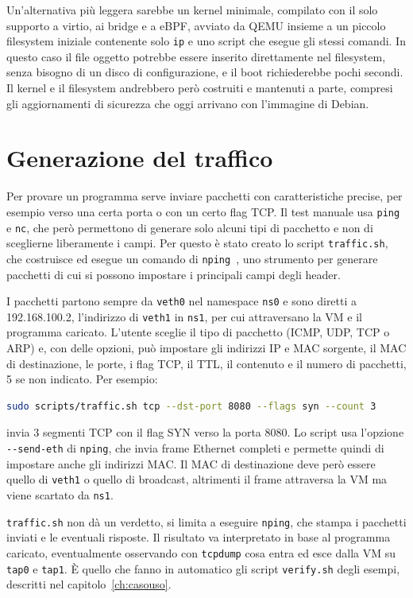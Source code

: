 Un'alternativa più leggera sarebbe un kernel minimale, compilato con il solo supporto a virtio, ai bridge e a eBPF, avviato da QEMU insieme a un piccolo filesystem iniziale contenente solo \texttt{ip} e uno script che esegue gli stessi comandi. In questo caso il file oggetto potrebbe essere inserito direttamente nel filesystem, senza bisogno di un disco di configurazione, e il boot richiederebbe pochi secondi.
Il kernel e il filesystem andrebbero però costruiti e mantenuti a parte, compresi gli aggiornamenti di sicurezza che oggi arrivano con l'immagine di Debian.

\section{Generazione del traffico}\label{sec:traffico}

Per provare un programma serve inviare pacchetti con caratteristiche precise, per esempio verso una certa porta o con un certo flag TCP. Il test manuale usa \texttt{ping} e \texttt{nc}, che però permettono di generare solo alcuni tipi di pacchetto e non di sceglierne liberamente i campi. Per questo è stato creato lo script \texttt{traffic.sh}, che costruisce ed esegue un comando di \texttt{nping}~\cite{nping}, uno strumento per generare pacchetti di cui si possono impostare i principali campi degli header.

I pacchetti partono sempre da \texttt{veth0} nel namespace \texttt{ns0} e sono diretti a 192.168.100.2, l'indirizzo di \texttt{veth1} in \texttt{ns1}, per cui attraversano la VM e il programma caricato. L'utente sceglie il tipo di pacchetto (ICMP, UDP, TCP o ARP) e, con delle opzioni, può impostare gli indirizzi IP e MAC sorgente, il MAC di destinazione, le porte, i flag TCP, il TTL, il contenuto e il numero di pacchetti, 5 se non indicato. Per esempio:
\begin{lstlisting}[language=bash, numbers=none, columns=fullflexible]
sudo scripts/traffic.sh tcp --dst-port 8080 --flags syn --count 3
\end{lstlisting}
invia 3 segmenti TCP con il flag SYN verso la porta 8080. Lo script usa l'opzione \texttt{-{}-send-eth} di \texttt{nping}, che invia frame Ethernet completi e permette quindi di impostare anche gli indirizzi MAC. Il MAC di destinazione deve però essere quello di \texttt{veth1} o quello di broadcast, altrimenti il frame attraversa la VM ma viene scartato da \texttt{ns1}.

\texttt{traffic.sh} non dà un verdetto, si limita a eseguire \texttt{nping}, che stampa i pacchetti inviati e le eventuali risposte. Il risultato va interpretato in base al programma caricato, eventualmente osservando con \texttt{tcpdump} cosa entra ed esce dalla VM su \texttt{tap0} e \texttt{tap1}. È quello che fanno in automatico gli script \texttt{verify.sh} degli esempi, descritti nel capitolo~\ref{ch:casouso}.
